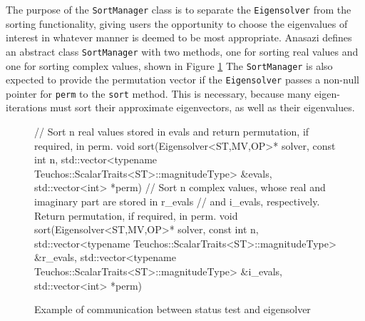 \documentclass[acmtoms]{acmtrans2m}
\newcommand{\aspace}[1]{\texttt{#1}}
\begin{document}
The purpose of the \aspace{SortManager} class is to separate the \aspace{Eigensolver} from the sorting
functionality, giving users the opportunity to choose the eigenvalues of interest in whatever manner is
deemed to be most appropriate. Anasazi defines an abstract class \aspace{SortManager} with
two methods, one for sorting real values and one for sorting complex values, shown in Figure \ref{fig:sort}
The \aspace{SortManager} is also expected to provide the permutation vector if the 
\aspace{Eigensolver} passes a non-null pointer for \verb!perm! to the \aspace{sort} method.  This is 
necessary, because many eigen-iterations must sort their approximate eigenvectors, as well as their 
eigenvalues.
\begin{figure}[htb]
\begin{center}
\begin{boxedverbatim}
// Sort n real values stored in evals and return permutation, if required, in perm.
void sort(Eigensolver<ST,MV,OP>* solver, 
          const int n, 
          std::vector<typename Teuchos::ScalarTraits<ST>::magnitudeType> &evals,
          std::vector<int> *perm) 
// Sort n complex values, whose real and imaginary part are stored in r_evals 
//   and i_evals, respectively. Return permutation, if required, in perm.
void sort(Eigensolver<ST,MV,OP>* solver, 
          const int n, 
          std::vector<typename Teuchos::ScalarTraits<ST>::magnitudeType> &r_evals, 
          std::vector<typename Teuchos::ScalarTraits<ST>::magnitudeType> &i_evals, 
          std::vector<int> *perm)
\end{boxedverbatim}
\end{center}
\caption{Example of communication between status test and eigensolver}
\label{fig:sort}
\end{figure}
\end{document}
